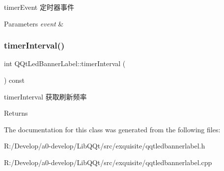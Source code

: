 timer\+Event 定时器事件 


\begin{DoxyParams}{Parameters}
{\em event} & \\
\hline
\end{DoxyParams}
\mbox{\label{class_q_qt_led_banner_label_a42395262bc37d0b2d18edae7599dd9c1}} 
\subsubsection{\texorpdfstring{timer\+Interval()}{timerInterval()}}
{\footnotesize\ttfamily int Q\+Qt\+Led\+Banner\+Label\+::timer\+Interval (\begin{DoxyParamCaption}{ }\end{DoxyParamCaption}) const}



timer\+Interval 获取刷新频率 

\begin{DoxyReturn}{Returns}

\end{DoxyReturn}


The documentation for this class was generated from the following files\+:\begin{DoxyCompactItemize}
\item 
R\+:/\+Develop/a0-\/develop/\+Lib\+Q\+Qt/src/exquisite/qqtledbannerlabel.\+h\item 
R\+:/\+Develop/a0-\/develop/\+Lib\+Q\+Qt/src/exquisite/qqtledbannerlabel.\+cpp\end{DoxyCompactItemize}
